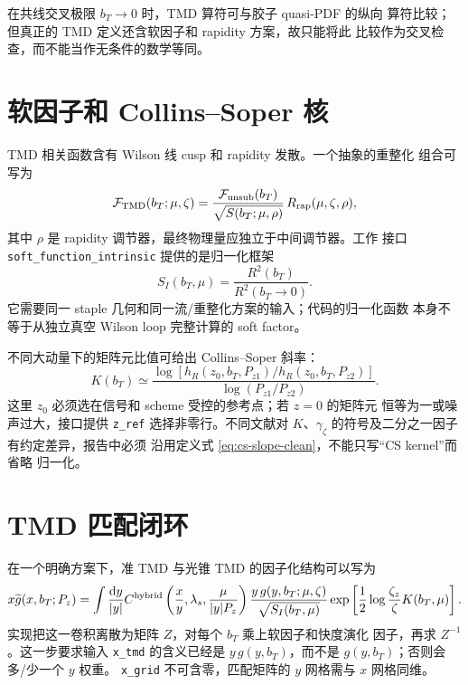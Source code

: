 \documentclass[UTF8,11pt,oneside]{ctexbook}
\newcommand{\dd}{\mathrm{d}}
\begin{document}
在共线交叉极限 \(b_T\to0\) 时，TMD 算符可与胶子 quasi-PDF 的纵向
算符比较；但真正的 TMD 定义还含软因子和 rapidity 方案，故只能将此
比较作为交叉检查，而不能当作无条件的数学等同。

\section{软因子和 Collins--Soper 核}
TMD 相关函数含有 Wilson 线 cusp 和 rapidity 发散。一个抽象的重整化
组合可写为
\begin{equation}
 \mathcal F_{\rm TMD}(b_T;\mu,\zeta)
 =\frac{\mathcal F_{\rm unsub}(b_T)}
 {\sqrt{S(b_T;\mu,\rho)}}\,R_{\rm rap}(\mu,\zeta,\rho),
 \label{eq:tmd-soft-rapidity-clean}
\end{equation}
其中 \(\rho\) 是 rapidity 调节器，最终物理量应独立于中间调节器。工作
接口 \texttt{soft\_function\_\allowbreak intrinsic} 提供的是归一化框架
\begin{equation}
 S_I(b_T,\mu)=\frac{R^2(b_T)}{R^2(b_T\to0)}.
 \label{eq:intrinsic-soft-clean}
\end{equation}
它需要同一 staple 几何和同一流/重整化方案的输入；代码的归一化函数
本身不等于从独立真空 Wilson loop 完整计算的 soft factor。

不同大动量下的矩阵元比值可给出 Collins--Soper 斜率：
\begin{equation}
 K(b_T)\simeq
 \frac{\log[h_R(z_0,b_T,P_{z1})/
 h_R(z_0,b_T,P_{z2})]}
 {\log(P_{z1}/P_{z2})}.
 \label{eq:cs-slope-clean}
\end{equation}
这里 \(z_0\) 必须选在信号和 scheme 受控的参考点；若 \(z=0\) 的矩阵元
恒等为一或噪声过大，接口提供 \texttt{z\_ref} 选择非零行。不同文献对
\(K\)、\(\gamma_\zeta\) 的符号及二分之一因子有约定差异，报告中必须
沿用定义式 \eqref{eq:cs-slope-clean}，不能只写“CS kernel”而省略
归一化。

\section{TMD 匹配闭环}
在一个明确方案下，准 TMD 与光锥 TMD 的因子化结构可以写为
\begin{equation}
 x\widetilde g(x,b_T;P_z)
 =\int\frac{\dd y}{|y|}
 C^{\rm hybrid}\left(\frac{x}{y},
 \lambda_s,\frac{\mu}{|y|P_z}\right)
 \frac{y\,g(y,b_T;\mu,\zeta)}{\sqrt{S_I(b_T,\mu)}}
 \exp\left[\frac12\log\frac{\zeta_z}{\zeta}K(b_T,\mu)\right].
 \label{eq:tmd-matching-clean}
\end{equation}
实现把这一卷积离散为矩阵 \(Z\)，对每个 \(b_T\) 乘上软因子和快度演化
因子，再求 \(Z^{-1}\)。这一步要求输入 \texttt{x\_tmd} 的含义已经是
\(y\,g(y,b_T)\)，而不是 \(g(y,b_T)\)；否则会多/少一个 \(y\) 权重。
\texttt{x\_grid} 不可含零，匹配矩阵的 \(y\) 网格需与 \(x\) 网格同维。
\end{document}
